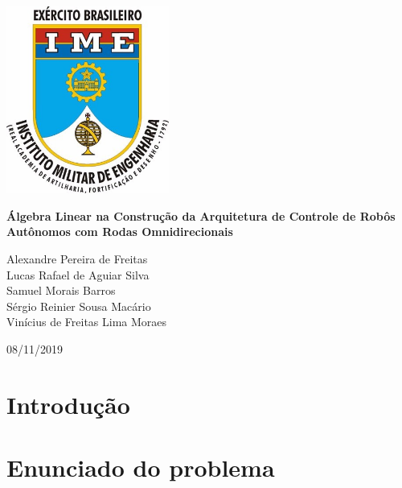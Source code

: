 \documentclass{article}
\begin{document}
\begin{titlepage}
    \begin{center}

        \includegraphics[width=0.4\textwidth]{ime.jpg}

        \vspace{1cm}

        \Huge
        \textbf{Álgebra Linear na Construção da Arquitetura de Controle de Robôs Autônomos com Rodas Omnidirecionais}
 
        \vspace{0.5cm}
        \LARGE
 
        \vspace{1.5cm}
 
        Alexandre Pereira de Freitas\\
        Lucas Rafael de Aguiar Silva\\
        Samuel Morais Barros\\
        Sérgio Reinier Sousa Macário\\
        Vinícius de Freitas Lima Moraes\\
 
        \vfill
 
        \vspace{0.8cm}
 
        \Large
        08/11/2019
 
    \end{center}
\end{titlepage}

\tableofcontents
\newpage

\section{Introdução}

\section{Enunciado do problema}
\end{document}
